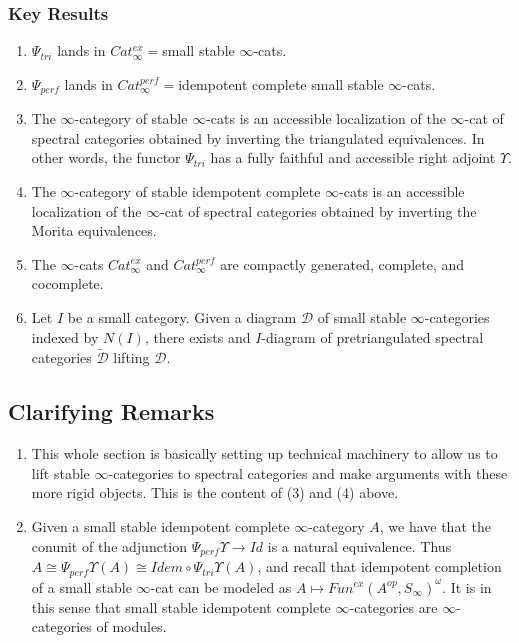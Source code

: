 \documentclass[letterpaper]{article}
\theoremstyle{definition}
\newcommand{\mc}{\mathcal}
\begin{document}
\subsubsection{Key Results}
\begin{enumerate}
\item $\Psi_{tri}$ lands in $Cat^{ex}_{\infty} = $small stable $\infty$-cats.
\item $\Psi_{perf}$ lands in $Cat^{perf}_{\infty} = $idempotent
  complete small stable $\infty$-cats.
\item The $\infty$-category of stable $\infty$-cats is an accessible
  localization of the $\infty$-cat of spectral categories obtained by
  inverting the triangulated equivalences. In other words, the functor
  $\Psi_{tri}$ has a fully faithful and accessible right adjoint $\Upsilon$.
\item The $\infty$-category of stable idempotent complete $\infty$-cats is an accessible
  localization of the $\infty$-cat of spectral categories obtained by
  inverting the Morita equivalences.
\item The $\infty$-cats $Cat_\infty^{ex}$ and $Cat_\infty^{perf}$ are
  compactly generated, complete, and cocomplete.
\item Let $I$ be a small category. Given a diagram $\mc D$ of small
  stable $\infty$-categories indexed by $N(I)$, there exists and
  $I$-diagram of pretriangulated spectral categories $\widetilde{\mc D}$
  lifting $\mc D$.
\end{enumerate}
\subsection{Clarifying Remarks}
\begin{enumerate}
\item This whole section is basically setting up technical machinery to allow us
  to lift stable $\infty$-categories to spectral categories and make
  arguments with these more rigid objects. This is the content of (3)
  and (4) above. 
\item Given a small stable idempotent complete $\infty$-category $A$,
  we have that the conunit of the adjunction $\Psi_{perf}\Upsilon
  \rightarrow Id$ is a natural equivalence. Thus $A \cong
  \Psi_{perf}\Upsilon(A) \cong Idem\circ \Psi_{tri}\Upsilon(A)$, and
  recall that idempotent completion of a small stable $\infty$-cat can
  be modeled as $A \mapsto Fun^{ex}(A^{op},S_{\infty})^{\omega}$. It
  is in this sense that small stable idempotent complete
  $\infty$-categories are $\infty$-categories of modules. 
\end{enumerate}
\end{document}

